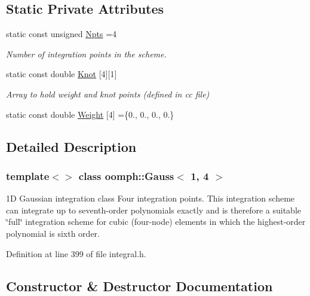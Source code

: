 \subsection*{Static Private Attributes}
\begin{DoxyCompactItemize}
\item 
static const unsigned \hyperlink{classoomph_1_1Gauss_3_011_00_014_01_4_a36bef895ea6c367b8dcf32e6d88c61cb}{Npts} =4
\begin{DoxyCompactList}\small\item\em Number of integration points in the scheme. \end{DoxyCompactList}\item 
static const double \hyperlink{classoomph_1_1Gauss_3_011_00_014_01_4_a2d2fc8511d8d60b5151b427bbe1b2187}{Knot} \mbox{[}4\mbox{]}\mbox{[}1\mbox{]}
\begin{DoxyCompactList}\small\item\em Array to hold weight and knot points (defined in cc file) \end{DoxyCompactList}\item 
static const double \hyperlink{classoomph_1_1Gauss_3_011_00_014_01_4_ac9b359ac61413b7d472d9ccf0f5b9786}{Weight} \mbox{[}4\mbox{]} =\{0., 0., 0., 0.\}
\end{DoxyCompactItemize}


\subsection{Detailed Description}
\subsubsection*{template$<$$>$\newline
class oomph\+::\+Gauss$<$ 1, 4 $>$}

1D Gaussian integration class Four integration points. This integration scheme can integrate up to seventh-\/order polynomials exactly and is therefore a suitable \char`\"{}full\char`\"{} integration scheme for cubic (four-\/node) elements in which the highest-\/order polynomial is sixth order. 

Definition at line 399 of file integral.\+h.



\subsection{Constructor \& Destructor Documentation}
\mbox{\label{classoomph_1_1Gauss_3_011_00_014_01_4_a7dde7d86132c98e27e88fec102a4b02c}} 
